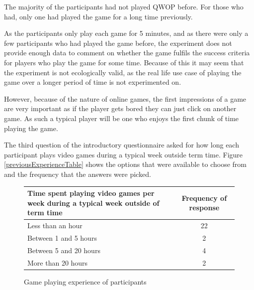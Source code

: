 \documentclass[12pt,a4paper,twoside,openright]{report}
\begin{document}
The majority of the participants had not played QWOP before. For those who had, only one had played the game for a long time previously.

As the participants only play each game for 5 minutes, and as there were only a few participants who had played the game before, the experiment does not provide enough data to comment on whether the game fulfils the success criteria for players who play the game for some time.
Because of this it may seem that the experiment is not ecologically valid, as the real life use case of playing the game over a longer period of time is not experimented on.

However, because of the nature of online games, the first impressions of a game are very important as if the player gets bored they can just click on another game.
As such a typical player will be one who enjoys the first chunk of time playing the game.




The third question of the introductory questionnaire asked for how long each participant plays video games during a typical week outside term time. Figure \ref{previousExperienceTable} shows the options that were available to choose from and the frequency that the answers were picked.

\begin{figure}[tbh]
\begin{center}
\begin{tabular}{ |p{8cm}|c| }
  \hline
Time spent playing video games per week during a typical week outside of term time & Frequency of response \\ \hline \hline
Less than an hour      & 22 \\ \hline
Between 1 and 5 hours  & 2  \\ \hline
Between 5 and 20 hours & 4  \\ \hline
More than 20 hours     & 2  \\ \hline
\end{tabular}
\end{center}
\caption{Game playing experience of participants}
\label{gamesExperienceTable}
\end{figure}
\end{document}

